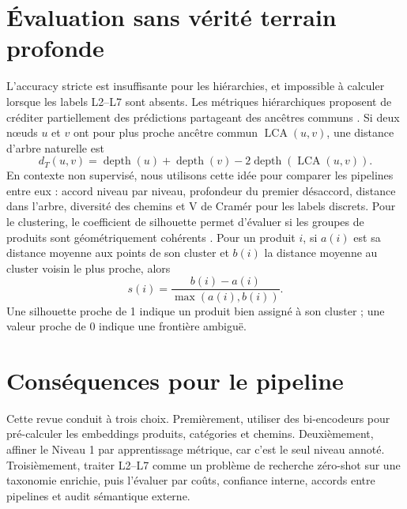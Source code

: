 \documentclass[12pt,a4paper]{report}
\begin{document}
\section{Évaluation sans vérité terrain profonde}
\label{sec:lit-hierarchical-assessment}

L'accuracy stricte est insuffisante pour les hiérarchies, et impossible à calculer lorsque les labels L2--L7 sont absents. Les métriques hiérarchiques proposent de créditer partiellement des prédictions partageant des ancêtres communs \cite{costa2007review}. Si deux nœuds $u$ et $v$ ont pour plus proche ancêtre commun $\operatorname{LCA}(u,v)$, une distance d'arbre naturelle est
\begin{equation}
    d_T(u,v)
    =
    \operatorname{depth}(u)+\operatorname{depth}(v)
    -
    2\operatorname{depth}(\operatorname{LCA}(u,v)).
\end{equation}
En contexte non supervisé, nous utilisons cette idée pour comparer les pipelines entre eux : accord niveau par niveau, profondeur du premier désaccord, distance dans l'arbre, diversité des chemins et V de Cramér pour les labels discrets. Pour le clustering, le coefficient de silhouette permet d'évaluer si les groupes de produits sont géométriquement cohérents \cite{rousseeuw1987silhouettes}. Pour un produit $i$, si $a(i)$ est sa distance moyenne aux points de son cluster et $b(i)$ la distance moyenne au cluster voisin le plus proche, alors
\begin{equation}
    s(i)=\frac{b(i)-a(i)}{\max(a(i),b(i))}.
\end{equation}
Une silhouette proche de 1 indique un produit bien assigné à son cluster ; une valeur proche de 0 indique une frontière ambiguë.

\section{Conséquences pour le pipeline}
\label{sec:lit-l2-l7-consequences}

Cette revue conduit à trois choix. Premièrement, utiliser des bi-encodeurs pour pré-calculer les embeddings produits, catégories et chemins. Deuxièmement, affiner le Niveau 1 par apprentissage métrique, car c'est le seul niveau annoté. Troisièmement, traiter L2--L7 comme un problème de recherche zéro-shot sur une taxonomie enrichie, puis l'évaluer par coûts, confiance interne, accords entre pipelines et audit sémantique externe.

\end{document}
